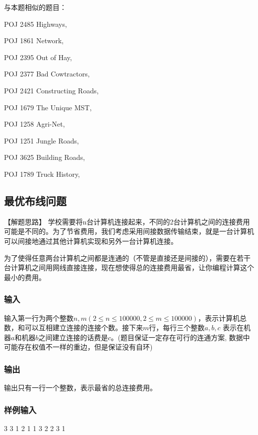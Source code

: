 与本题相似的题目：
\begindot
\item POJ 2485 Highways, 
\item POJ 1861 Network, 
\item POJ 2395 Out of Hay, 
\item POJ 2377 Bad Cowtractors, 
\item POJ 2421 Constructing Roads, 
\item POJ 1679 The Unique MST, 
\item POJ 1258 Agri-Net, 
\item POJ 1251 Jungle Roads, 
\item POJ 3625 Building Roads, 
\item POJ 1789 Truck History, 
\myenddot


\subsection{最优布线问题 }
【解题思路】
学校需要将n台计算机连接起来，不同的2台计算机之间的连接费用可能是不同的。为了节省费用，我们考虑采用间接数据传输结束，就是一台计算机可以间接地通过其他计算机实现和另外一台计算机连接。

为了使得任意两台计算机之间都是连通的（不管是直接还是间接的），需要在若干台计算机之间用网线直接连接，现在想使得总的连接费用最省，让你编程计算这个最小的费用。

\subsubsection{输入}
输入第一行为两个整数$n,m(2 \leq n \leq 100000,2\leq m \leq 100000)$，表示计算机总数，和可以互相建立连接的连接个数。接下来$m$行，每行三个整数$a,b,c$ 表示在机器$a$和机器$b$之间建立连接的话费是$c$。(题目保证一定存在可行的连通方案, 数据中可能存在权值不一样的重边，但是保证没有自环)

\subsubsection{输出}
输出只有一行一个整数，表示最省的总连接费用。

\subsubsection{样例输入}
\begin{Code}
3 3
1 2 1
1 3 2
2 3 1
\end{Code}

